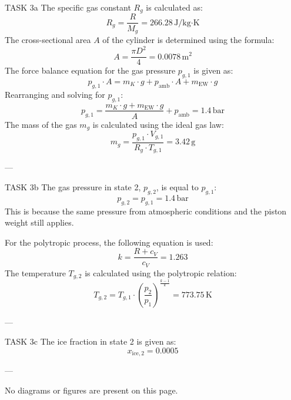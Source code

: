 TASK 3a  
The specific gas constant \( R_g \) is calculated as:  
\[
R_g = \frac{R}{M_g} = 266.28 \, \text{J/kg·K}
\]  
The cross-sectional area \( A \) of the cylinder is determined using the formula:  
\[
A = \frac{\pi D^2}{4} = 0.0078 \, \text{m}^2
\]  
The force balance equation for the gas pressure \( p_{g,1} \) is given as:  
\[
p_{g,1} \cdot A = m_K \cdot g + p_{\text{amb}} \cdot A + m_{\text{EW}} \cdot g
\]  
Rearranging and solving for \( p_{g,1} \):  
\[
p_{g,1} = \frac{m_K \cdot g + m_{\text{EW}} \cdot g}{A} + p_{\text{amb}} = 1.4 \, \text{bar}
\]  
The mass of the gas \( m_g \) is calculated using the ideal gas law:  
\[
m_g = \frac{p_{g,1} \cdot V_{g,1}}{R_g \cdot T_{g,1}} = 3.42 \, \text{g}
\]  

---

TASK 3b  
The gas pressure in state 2, \( p_{g,2} \), is equal to \( p_{g,1} \):  
\[
p_{g,2} = p_{g,1} = 1.4 \, \text{bar}
\]  
This is because the same pressure from atmospheric conditions and the piston weight still applies.  

For the polytropic process, the following equation is used:  
\[
k = \frac{R + c_V}{c_V} = 1.263
\]  
The temperature \( T_{g,2} \) is calculated using the polytropic relation:  
\[
T_{g,2} = T_{g,1} \cdot \left( \frac{p_2}{p_1} \right)^{\frac{k-1}{k}} = 773.75 \, \text{K}
\]  

---

TASK 3c  
The ice fraction in state 2 is given as:  
\[
x_{\text{ice},2} = 0.0005
\]  

---

No diagrams or figures are present on this page.